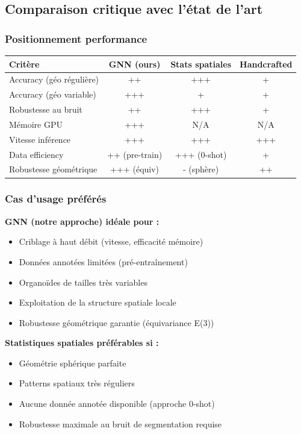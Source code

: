 \subsection{Comparaison critique avec l'état de l'art}

\subsubsection{Positionnement performance}

\begin{center}
\begin{tabular}{|l|c|c|c|}
\hline
\textbf{Critère} & \textbf{GNN (ours)} & \textbf{Stats spatiales} & \textbf{Handcrafted} \\
\hline
Accuracy (géo régulière) & ++ & +++ & + \\
Accuracy (géo variable) & +++ & + & + \\
Robustesse au bruit & ++ & +++ & + \\
Mémoire GPU & +++ & N/A & N/A \\
Vitesse inférence & +++ & +++ & +++ \\
Data efficiency & ++ (pre-train) & +++ (0-shot) & + \\
Robustesse géométrique & +++ (équiv) & - (sphère) & ++ \\
\hline
\end{tabular}
\end{center}

\subsubsection{Cas d'usage préférés}

\textbf{GNN (notre approche) idéale pour :}
\begin{itemize}
    \item Criblage à haut débit (vitesse, efficacité mémoire)
    \item Données annotées limitées (pré-entraînement)
    \item Organoïdes de tailles très variables
    \item Exploitation de la structure spatiale locale
    \item Robustesse géométrique garantie (équivariance E(3))
\end{itemize}

\textbf{Statistiques spatiales préférables si :}
\begin{itemize}
    \item Géométrie sphérique parfaite
    \item Patterns spatiaux très réguliers
    \item Aucune donnée annotée disponible (approche 0-shot)
    \item Robustesse maximale au bruit de segmentation requise
\end{itemize}

